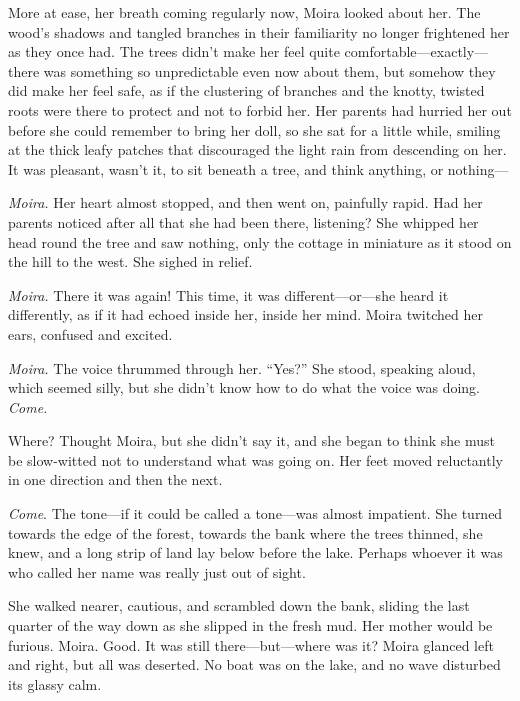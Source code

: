 \documentclass[letterpaper, twoside, 12pt]{memoir}
\begin{document}
More at ease, her breath coming regularly now, Moira looked about her. The wood’s shadows and tangled branches in their familiarity no longer frightened her as they once had. The trees didn’t make her feel quite comfortable---exactly---there was something so unpredictable even now about them, but somehow they did make her feel safe, as if the clustering of branches and the knotty, twisted roots were there to protect and not to forbid her.
Her parents had hurried her out before she could remember to bring her doll, so she sat for a little while, smiling at the thick leafy patches that discouraged the light rain from descending on her. It was pleasant, wasn’t it, to sit beneath a tree, and think anything, or nothing---

\textit{Moira.}
Her heart almost stopped, and then went on, painfully rapid. Had her parents noticed after all that she had been there, listening? She whipped her head round the tree and saw nothing, only the cottage in miniature as it stood on the hill to the west. She sighed in relief.

\textit{Moira.}
There it was again! This time, it was different---or---she heard it differently, as if it had echoed inside her, inside her mind. Moira twitched her ears, confused and excited.

\textit{Moira.} The voice thrummed through her.
“Yes?” She stood, speaking aloud, which seemed silly, but she didn’t know how to do what the voice was doing.
\textit{Come.}

Where? Thought Moira, but she didn’t say it, and she began to think she must be slow-witted not to understand what was going on. Her feet moved reluctantly in one direction and then the next.

\textit{Come}. The tone---if it could be called a tone---was almost impatient.
She turned towards the edge of the forest, towards the bank where the trees thinned, she knew, and a long strip of land lay below before the lake. Perhaps whoever it was who called her name was really just out of sight.

She walked nearer, cautious, and scrambled down the bank, sliding the last quarter of the way down as she slipped in the fresh mud. Her mother would be furious.
Moira.
Good. It was still there---but---where was it? Moira glanced left and right, but all was deserted. No boat was on the lake, and no wave disturbed its glassy calm.
\end{document}
